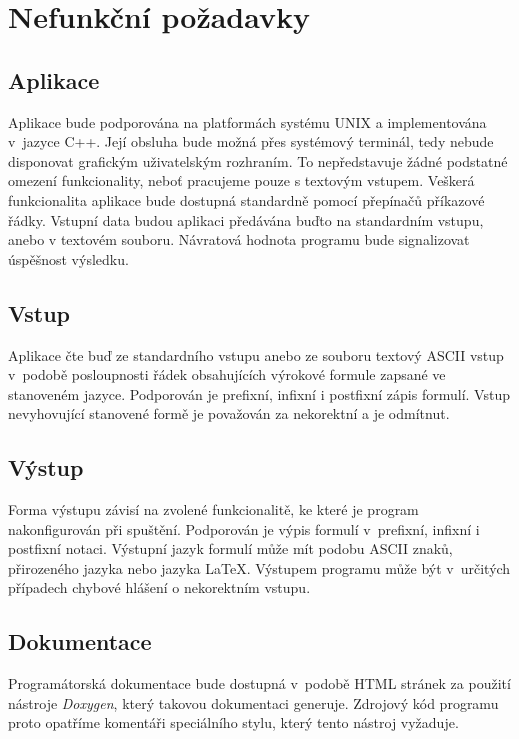 \documentclass[thesis=B,czech,hidelinks]{thesis}[2012/06/26]
\begin{document}
\section{Nefunkční požadavky}

\subsection{Aplikace}

Aplikace bude podporována na platformách systému UNIX a implementována v~jazyce C++. Její obsluha bude možná přes systémový terminál, tedy nebude disponovat grafickým uživatelským rozhraním. To nepředstavuje žádné podstatné omezení funkcionality, neboť pracujeme pouze s textovým vstupem. Veškerá funkcionalita aplikace bude dostupná standardně pomocí přepínačů příkazové řádky. Vstupní data budou aplikaci předávána buďto na standardním vstupu, anebo v textovém souboru. Návratová hodnota programu bude signalizovat úspěšnost výsledku.

\subsection{Vstup}

Aplikace čte buď ze standardního vstupu anebo ze souboru textový ASCII vstup v~podobě posloupnosti řádek obsahujících výrokové formule zapsané ve stanoveném jazyce. Podporován je prefixní, infixní i postfixní zápis formulí. Vstup nevyhovující stanovené formě je považován za nekorektní a je odmítnut.

\subsection{Výstup}

Forma výstupu závisí na zvolené funkcionalitě, ke které je program nakonfigurován při spuštění. Podporován je výpis formulí v~prefixní, infixní i postfixní notaci. Výstupní jazyk formulí může mít podobu ASCII znaků, přirozeného jazyka nebo jazyka \LaTeX. Výstupem programu může být v~určitých případech chybové hlášení o nekorektním vstupu.

\subsection{Dokumentace}

Programátorská dokumentace bude dostupná v~podobě HTML stránek za použití nástroje \emph{Doxygen}, který takovou dokumentaci generuje. Zdrojový kód programu proto opatříme komentáři speciálního stylu, který tento nástroj vyžaduje.
\end{document}
